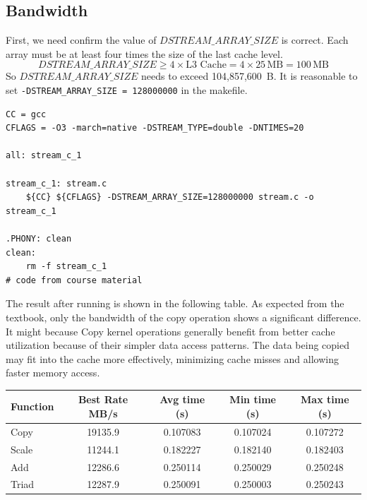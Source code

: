 \documentclass[unicode,11pt,a4paper,oneside,numbers=endperiod,openany]{scrartcl}
\begin{document}
\subsection{Bandwidth}
First, we need confirm the value of $DSTREAM\_ARRAY\_SIZE$ is correct. Each array must be at least four times the size of the last cache level. 
\begin{equation}
    DSTREAM\_ARRAY\_SIZE \geq 4 \times \text{L3 Cache} = 4 \times 25 \, \text{MB} = 100 \, \text{MB}
\end{equation}
So $DSTREAM\_ARRAY\_SIZE$ needs to exceed 104,857,600 B. It is reasonable to set
\texttt{-DSTREAM\_ARRAY\_SIZE = 128000000} in the makefile.
\begin{lstlisting}[language=MyBatch, style=mystyle, caption={The makefile}]
CC = gcc
CFLAGS = -O3 -march=native -DSTREAM_TYPE=double -DNTIMES=20 

all: stream_c_1

stream_c_1: stream.c
    ${CC} ${CFLAGS} -DSTREAM_ARRAY_SIZE=128000000 stream.c -o stream_c_1

.PHONY: clean
clean:
    rm -f stream_c_1
# code from course material
\end{lstlisting}

The result after running is shown in the following table. As expected from the textbook, only the bandwidth of the copy operation shows a significant difference. It might because Copy kernel operations generally benefit from better cache utilization because of their simpler data access patterns. The data being copied may fit into the cache more effectively, minimizing cache misses and allowing faster memory access\cite{hager2010introduction}.

\begin{tabular}{|l|c|c|c|c|}
\hline
\textbf{Function} & \textbf{Best Rate MB/s} & \textbf{Avg time (s)} & \textbf{Min time (s)} & \textbf{Max time (s)} \\
\hline
Copy  & 19135.9 & 0.107083 & 0.107024 & 0.107272 \\
\hline
Scale & 11244.1 & 0.182227 & 0.182140 & 0.182403 \\
\hline
Add   & 12286.6 & 0.250114 & 0.250029 & 0.250248 \\
\hline
Triad & 12287.9 & 0.250091 & 0.250003 & 0.250243 \\
\hline
\end{tabular}
\end{document}
